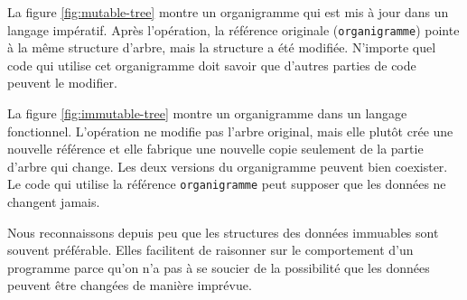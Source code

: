 \documentclass[french]{report}
\begin{document}
La figure \ref{fig:mutable-tree} montre un organigramme qui est mis à jour dans un langage impératif. Après l'opération, la référence originale (\texttt{organigramme}) pointe à la même structure d'arbre, mais la structure a été modifiée. N'importe quel code qui utilise cet organigramme doit savoir que d'autres parties de code peuvent le modifier.

La figure \ref{fig:immutable-tree} montre un organigramme dans un langage fonctionnel. L'opération ne modifie pas l'arbre original, mais elle plutôt crée une nouvelle référence et elle fabrique une nouvelle copie seulement de la partie d'arbre qui change. Les deux versions du organigramme peuvent bien coexister. Le code qui utilise la référence \texttt{organigramme} peut supposer que les données ne changent jamais.

Nous reconnaissons depuis peu que les structures des données immuables sont souvent préférable. Elles facilitent de raisonner sur le comportement d'un programme parce qu'on n'a pas à se soucier de la possibilité que les données peuvent être changées de manière imprévue.
\end{document}
